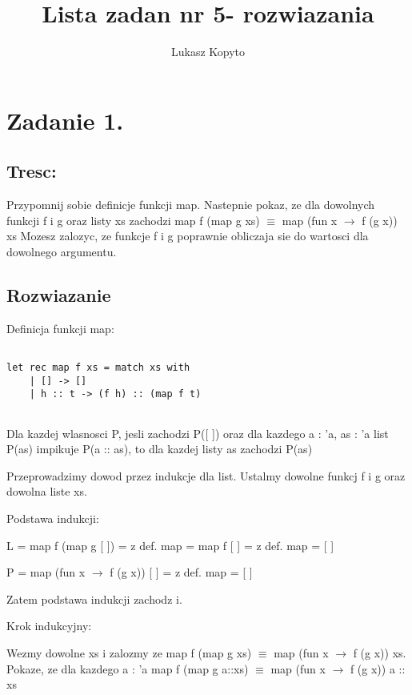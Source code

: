\documentclass{article}
\author{Lukasz Kopyto}
\title{Lista zadan nr 5- rozwiazania}
\begin{document}
\maketitle

\section{Zadanie 1.}

\subsection{Tresc:}
Przypomnij sobie definicje funkcji map. Nastepnie pokaz, ze dla dowolnych funkcji f i g oraz listy xs zachodzi map f (map g xs) $\equiv$ map (fun x $\rightarrow$ f (g x)) xs
Mozesz zalozyc, ze funkcje f i g poprawnie obliczaja sie do wartosci dla dowolnego argumentu.

\subsection{Rozwiazanie}

Definicja funkcji map:

\begin{lstlisting}

let rec map f xs = match xs with
    | [] -> [] 
    | h :: t -> (f h) :: (map f t)
    
\end{lstlisting}

\begin{tcolorbox}[colback=white!90!blue,colframe=black!35!blue,title=Zasada indukcji dla list typu 'a list]

Dla kazdej wlasnosci P, jesli zachodzi P([ ]) oraz dla kazdego a : 'a, as : 'a list P(as) impikuje P(a :: as), to dla kazdej listy as zachodzi P(as)

\end{tcolorbox}

Przeprowadzimy dowod przez indukcje dla list.
Ustalmy dowolne funkcj f i g oraz dowolna liste xs.

Podstawa indukcji:

L = map f (map g [ ]) = z def. map = map f [ ] =  z def. map = [ ] 

P = map (fun x $\rightarrow$ f (g x)) [ ] = z def. map = [ ]

Zatem podstawa indukcji zachodz i.

Krok indukcyjny:

Wezmy dowolne xs i zalozmy ze map f (map g xs) $\equiv$ map (fun x $\rightarrow$ f (g x)) xs. Pokaze, ze dla kazdego a : 'a map f (map g a::xs) $\equiv$ map (fun x $\rightarrow$ f (g x)) a :: xs
\end{document}
